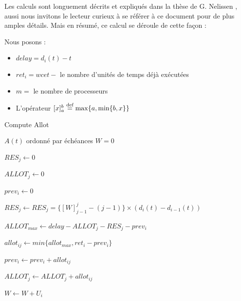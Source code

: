 	Les calculs sont longuement décrits et expliqués dans la thèse de G. Nelissen \cite{nelissen_u-edf_2012}, aussi nous invitons 
	le lecteur curieux à se référer à ce document pour de plus amples détails. Mais en résumé, 
	ce calcul se déroule de cette façon :
	
	Nous posons :
	\begin{itemize}
		\item $delay = d_i(t) - t$
		\item $ret_i = wcet - $ le nombre d'unités de temps déjà exécutées
		\item $m = $ le nombre de processeurs
		\item L'opérateur $[x]_a^b \stackrel{\text{def}}{=} \max\{a, \min\{b, x \}\}$
	\end{itemize}

	\begin{algorithm}[H]
		\caption{Compute Allot}
		\begin{algorithmic}
			\REQUIRE $A(t)$ ordonné par échéances
			\STATE $W = 0$
			
				\item $RES_j \leftarrow 0$
				\item $ALLOT_j \leftarrow 0$
			\ENDFOR
	
				\item $prev_i \leftarrow 0$
					\item $RES_j \leftarrow RES_j = \{[W]_{j-1}^{j} - (j - 1)\}\times (d_i(t) - d_{i-1}(t))$
					\item $ALLOT_{max} \leftarrow delay - ALLOT_j - RES_j - prev_i$
					\item $allot_{ij} \leftarrow min\{allot_{max}, ret_i - prev_i\}$
					\item $prev_i \leftarrow prev_i + allot_{ij}$
					\item $ALLOT_j \leftarrow ALLOT_j + allot_{ij}$
				\ENDFOR
				\item $W \leftarrow W + U_i$
			\ENDFOR
		\end{algorithmic}
	\end{algorithm}
	
